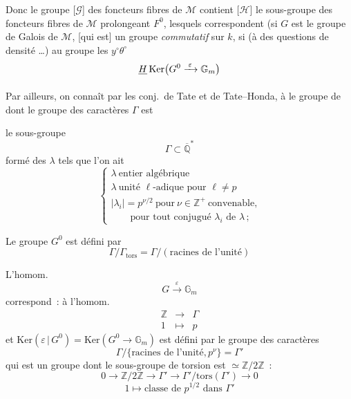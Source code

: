 \documentclass[11pt,a4paper]{article}
\begin{document}
Donc le groupe  [$\mathcal{G}$] des foncteurs fibres de $\mathcal{M}$ contient 
[$\mathcal{H}$] le sous-groupe des foncteurs fibres de $\mathcal{M}$ prolongeant $F^0$, lesquels
correspondent (si $G$ est le groupe de Galois de $\mathcal{M}$, [qui est] un groupe
\emph{commutatif} sur $k$, si \ill{} \ill{} (à des questions de densité …) au groupe
 les $y^{\circ}\theta^{\circ}$ \ill{}
\[
  \struck{H}\,\mathrm{Ker}\bigl(G^{0} \xrightarrow{\;\varepsilon\;} \mathbb{G}_m\bigr)
\]

Par ailleurs, \struck{\ill{}} on connaît par les conj.\ de Tate et de Tate--Honda, 
à  le groupe de \ \ill{} dont le groupe des caractères $\Gamma$ est

le sous-groupe
\[
  \Gamma \subset \overline{\mathbb{Q}}^{*}
\]
formé des $\lambda$ tels que l'on ait
\[
  \begin{cases}
    \lambda \ \text{entier algébrique} \\
    \lambda \ \text{unité } \ell\text{-adique pour } \ell \neq p \\
    |\lambda_i| = p^{\nu/2} \ \text{pour} \ \nu \in \mathbb{Z}^{+} \ \text{convenable,} \\
    \qquad \text{pour tout conjugué } \lambda_i \text{ de } \lambda\,;
  \end{cases}
\]

Le groupe $G^{0}$ est défini par
\[
  \Gamma / \Gamma_{\mathrm{tors}} = \Gamma / (\text{racines de l'unité})
\]

L'homom.
\[
  G \xrightarrow{\;\varepsilon\;} \mathbb{G}_m
\]
correspond~: à l'homom.
\[
  \begin{array}{ccc}
    \mathbb{Z} & \longrightarrow & \Gamma \\
    1 & \longmapsto & p
  \end{array}
\]
et $\mathrm{Ker}(\varepsilon \,|\, G^{0}) = \mathrm{Ker}(G^{0} \to \mathbb{G}_m)$ est défini par le groupe des caractères
\[
  \Gamma / \{\text{racines de l'unité}, p^{\nu}\} = \Gamma'
\]
qui est un groupe  dont le sous-groupe de torsion est $\simeq \mathbb{Z}/2\mathbb{Z}$~:
\[
  0 \longrightarrow \mathbb{Z}/2\mathbb{Z} \longrightarrow \Gamma' \longrightarrow \Gamma'/\mathrm{tors}(\Gamma') \longrightarrow 0
\]
\[
  1 \longmapsto \text{classe de } p^{1/2} \text{ dans } \Gamma'
\]
\end{document}
